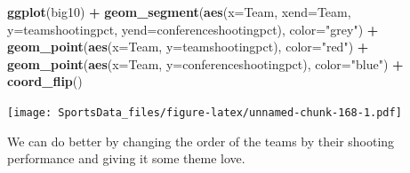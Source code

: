 \documentclass[]{book}
\newenvironment{Shaded}{\begin{snugshade}}{\end{snugshade}}
\newcommand{\KeywordTok}[1]{\textcolor[rgb]{0.13,0.29,0.53}{\textbf{#1}}}
\newcommand{\DataTypeTok}[1]{\textcolor[rgb]{0.13,0.29,0.53}{#1}}
\newcommand{\StringTok}[1]{\textcolor[rgb]{0.31,0.60,0.02}{#1}}
\newcommand{\OperatorTok}[1]{\textcolor[rgb]{0.81,0.36,0.00}{\textbf{#1}}}
\newcommand{\NormalTok}[1]{#1}
\begin{document}
\begin{Shaded}
\begin{Highlighting}[]
\KeywordTok{ggplot}\NormalTok{(big10) }\OperatorTok{+}
\StringTok{  }\KeywordTok{geom_segment}\NormalTok{(}\KeywordTok{aes}\NormalTok{(}\DataTypeTok{x=}\NormalTok{Team, }\DataTypeTok{xend=}\NormalTok{Team, }\DataTypeTok{y=}\NormalTok{teamshootingpct, }\DataTypeTok{yend=}\NormalTok{conferenceshootingpct), }\DataTypeTok{color=}\StringTok{"grey"}\NormalTok{) }\OperatorTok{+}\StringTok{ }
\StringTok{  }\KeywordTok{geom_point}\NormalTok{(}\KeywordTok{aes}\NormalTok{(}\DataTypeTok{x=}\NormalTok{Team, }\DataTypeTok{y=}\NormalTok{teamshootingpct), }\DataTypeTok{color=}\StringTok{"red"}\NormalTok{) }\OperatorTok{+}\StringTok{ }
\StringTok{  }\KeywordTok{geom_point}\NormalTok{(}\KeywordTok{aes}\NormalTok{(}\DataTypeTok{x=}\NormalTok{Team, }\DataTypeTok{y=}\NormalTok{conferenceshootingpct), }\DataTypeTok{color=}\StringTok{"blue"}\NormalTok{) }\OperatorTok{+}
\StringTok{  }\KeywordTok{coord_flip}\NormalTok{()}
\end{Highlighting}
\end{Shaded}

\texttt{[image: SportsData\_files/figure-latex/unnamed-chunk-168-1.pdf]}

We can do better by changing the order of the teams by their shooting
performance and giving it some theme love.
\end{document}
